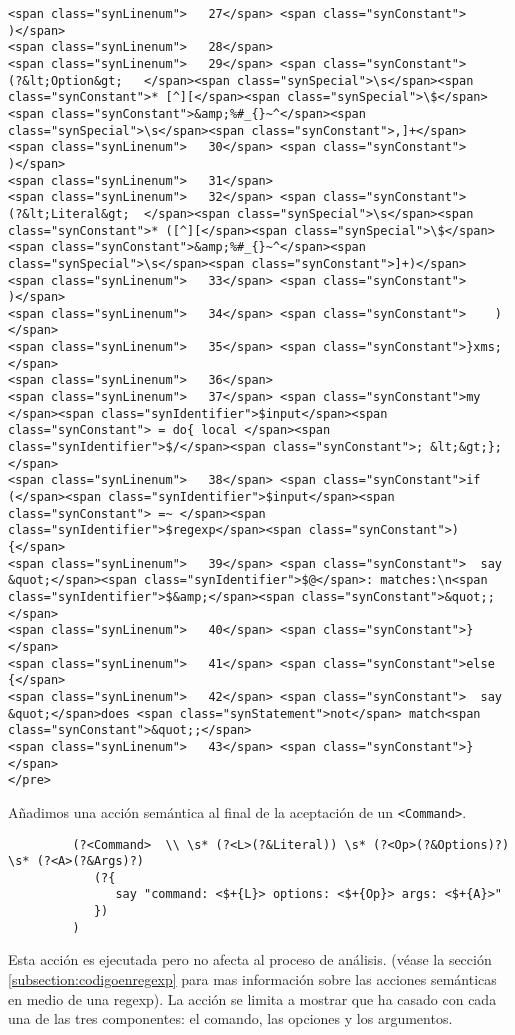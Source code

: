 \begin{verbatim}
<span class="synLinenum">   27</span> <span class="synConstant">        )</span>
<span class="synLinenum">   28</span> 
<span class="synLinenum">   29</span> <span class="synConstant">        (?&lt;Option&gt;   </span><span class="synSpecial">\s</span><span class="synConstant">* [^][</span><span class="synSpecial">\$</span><span class="synConstant">&amp;%#_{}~^</span><span class="synSpecial">\s</span><span class="synConstant">,]+</span>
<span class="synLinenum">   30</span> <span class="synConstant">        )</span>
<span class="synLinenum">   31</span> 
<span class="synLinenum">   32</span> <span class="synConstant">        (?&lt;Literal&gt;  </span><span class="synSpecial">\s</span><span class="synConstant">* ([^][</span><span class="synSpecial">\$</span><span class="synConstant">&amp;%#_{}~^</span><span class="synSpecial">\s</span><span class="synConstant">]+)</span>
<span class="synLinenum">   33</span> <span class="synConstant">        )</span>
<span class="synLinenum">   34</span> <span class="synConstant">    )</span>
<span class="synLinenum">   35</span> <span class="synConstant">}xms;</span>
<span class="synLinenum">   36</span> 
<span class="synLinenum">   37</span> <span class="synConstant">my </span><span class="synIdentifier">$input</span><span class="synConstant"> = do{ local </span><span class="synIdentifier">$/</span><span class="synConstant">; &lt;&gt;};</span>
<span class="synLinenum">   38</span> <span class="synConstant">if (</span><span class="synIdentifier">$input</span><span class="synConstant"> =~ </span><span class="synIdentifier">$regexp</span><span class="synConstant">) {</span>
<span class="synLinenum">   39</span> <span class="synConstant">  say &quot;</span><span class="synIdentifier">$@</span>: matches:\n<span class="synIdentifier">$&amp;</span><span class="synConstant">&quot;;</span>
<span class="synLinenum">   40</span> <span class="synConstant">}</span>
<span class="synLinenum">   41</span> <span class="synConstant">else {</span>
<span class="synLinenum">   42</span> <span class="synConstant">  say &quot;</span>does <span class="synStatement">not</span> match<span class="synConstant">&quot;;</span>
<span class="synLinenum">   43</span> <span class="synConstant">}</span>
</pre>

\end{verbatim}


Añadimos una acción semántica al final de la aceptación de un \verb|<Command>|.

\begin{verbatim}
         (?<Command>  \\ \s* (?<L>(?&Literal)) \s* (?<Op>(?&Options)?) \s* (?<A>(?&Args)?)
            (?{
               say "command: <$+{L}> options: <$+{Op}> args: <$+{A}>"
            })
         )
\end{verbatim}
Esta acción es ejecutada pero no afecta al proceso de análisis.
(véase la sección
\ref{subsection:codigoenregexp} para mas información sobre las acciones semánticas
en medio de una regexp).
La acción se limita a mostrar que ha casado con cada una de las tres componentes:
el comando, las opciones y los argumentos.

